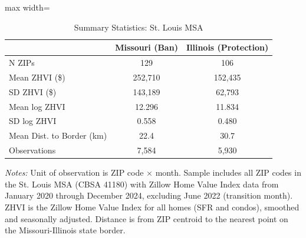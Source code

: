 \begin{table}[H]
\centering
\caption{Summary Statistics: St. Louis MSA}
\label{tab:summary}
\begin{threeparttable}
\begin{adjustbox}{max width=\textwidth}
\begin{tabular}{lcc}
\toprule
& Missouri (Ban) & Illinois (Protection) \\
\midrule
N ZIPs & 129 & 106 \\
Mean ZHVI (\$) & 252,710 & 152,435 \\
SD ZHVI (\$) & 143,189 & 62,793 \\
Mean log ZHVI & 12.296 & 11.834 \\
SD log ZHVI & 0.558 & 0.480 \\
Mean Dist. to Border (km) & 22.4 & 30.7 \\
Observations & 7,584 & 5,930 \\
\bottomrule
\end{tabular}
\end{adjustbox}
\begin{tablenotes}[flushleft]
\small
\item \textit{Notes:} Unit of observation is ZIP code $\times$ month. Sample includes all ZIP codes in the St. Louis MSA (CBSA 41180) with Zillow Home Value Index data from January 2020 through December 2024, excluding June 2022 (transition month). ZHVI is the Zillow Home Value Index for all homes (SFR and condos), smoothed and seasonally adjusted. Distance is from ZIP centroid to the nearest point on the Missouri-Illinois state border.
\end{tablenotes}
\end{threeparttable}
\end{table}
